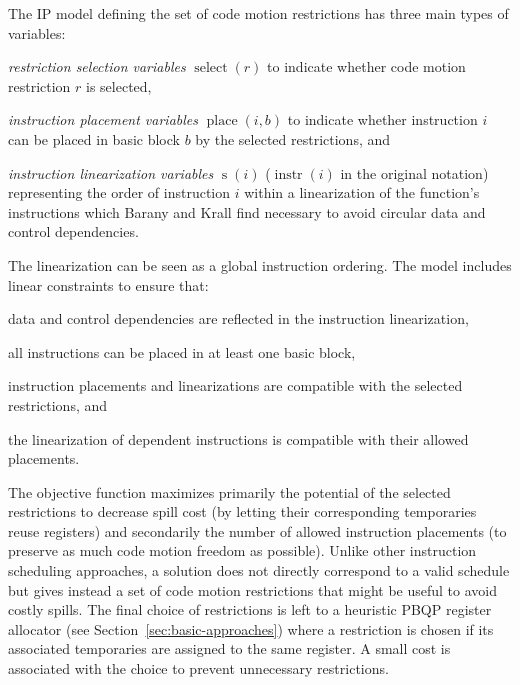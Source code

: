 \documentclass[acmsmall,authorversion,nonacm]{acmart}
\newcommand{\noMathVar}[2]{\operatorname{#1}(#2)}
\newcommand{\var}[2]{$\noMathVar{#1}{#2}$}
\begin{document}
The IP model defining the set of code motion restrictions has three
main types of variables:
\begin{inparaitem}[]
\item \emph{restriction selection variables} \var{select}{r} to
  indicate whether code motion restriction $r$ is selected,
\item \emph{instruction placement variables} \var{place}{i,b} to
  indicate whether instruction $i$ can be placed in basic block $b$ by
  the selected restrictions, and
\item \emph{instruction linearization variables} \var{s}{i}
  (\var{instr}{i} in the original notation) representing the order of
  instruction $i$ within a linearization of the function's
  instructions which Barany and Krall find necessary to avoid circular
  data and control dependencies.
\end{inparaitem}
The linearization can be seen as a global instruction ordering.
The model includes linear constraints to ensure that:
\begin{inparaitem}[]
\item data and control dependencies are reflected in the instruction
  linearization,
\item all instructions can be placed in at least one basic block,
\item instruction placements and linearizations are compatible with
  the selected restrictions, and
\item the linearization of dependent instructions is compatible with
  their allowed placements.
\end{inparaitem}
The objective function maximizes primarily the potential of the
selected restrictions to decrease spill cost (by letting their
corresponding temporaries reuse registers) and secondarily the number
of allowed instruction placements (to preserve as much code motion
freedom as possible).
Unlike other instruction scheduling approaches, a solution does not
directly correspond to a valid schedule but gives instead a set of
code motion restrictions that might be useful to avoid costly spills.
The final choice of restrictions is left to a heuristic PBQP register
allocator (see Section~\ref{sec:basic-approaches}) where a restriction
is chosen if its associated temporaries are assigned to the same
register.
A small cost is associated with the choice to prevent unnecessary
restrictions.
\end{document}
